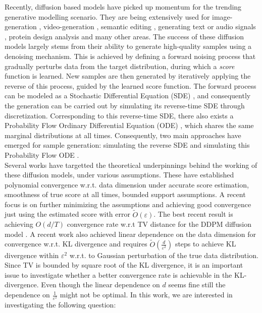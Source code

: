 \documentclass{article}
\begin{document}
\noindent
Recently, diffusion based models have picked up momentum for the trending generative modelling scenario. They are being extensively used  for image-generation \cite{song2019generative, croitoru2023diffusion, lugmayr2022repaint, song2020denoising, nichol2021glide, song2021maximum, ho2020denoising}, video-generation \cite{epstein2023diffusion, chen2023control}, semantic editing \cite{lugmayr2022repaint}, generating text \cite{li2022diffusion} or audio signals \cite{liu2023audioldm}, protein design analysis \cite{gruver2023protein, guo2024diffusion} and many other areas. The success of these diffusion models largely stems from their ability to generate high-quality samples using a denoising mechanism. This is achieved by defining a forward noising process that gradually perturbs data from the target distribution, during which a \textit{score} function is learned. New samples are then generated by iteratively applying the reverse of this process, guided by the learned score function. The forward process can be modeled as a Stochastic Differential Equation (SDE) \cite{song2020score}, and consequently the generation can be carried out by simulating its reverse-time SDE through discretization. Corresponding to this reverse-time SDE, there also exists a Probability Flow Ordinary Differential Equation (ODE) \cite{song2020score}, which shares the same marginal distributions at all times. Consequently, two main approaches have emerged for sample generation: simulating the reverse SDE \cite{song2020score, chen2022sampling} and simulating this Probability Flow ODE \cite{xu2024provably}. \\



\noindent
Several works \cite{chen2022sampling, chen2022improved, holzmuller2023convergence, benton2023nearly, li2024d} have targetted the theoretical underpinnings behind the working of these diffusion models, under various assumptions. These have established polynomial convergence w.r.t. data dimension under accurate score estimation, smoothness of true score at all times, bounded support assumptions. A recent focus \cite{chen2023improved, li2024d, benton2023nearly} is on further minimizing the assumptions and achieving good convergence just using the estimated score with error $\tilde{O}(\varepsilon)$. The best recent result \cite{li2024d} is achieving $O(d/T)$ convergence rate w.r.t TV distance for the DDPM diffusion model \cite{ho2020denoising}.
A recent work \cite{benton2023nearly} also achieved linear dependence on the data dimension for convergence w.r.t. KL divergence and requires $\tilde{O}(\frac{d}{\varepsilon^2})$ steps to achieve KL divergence within $\varepsilon^2$ w.r.t. to Gaussian perturbation of the true data distribution. Since TV is bounded by square root of the KL divergence, it is an important issue to investigate whether a better convergence rate is achievable in the KL-divergence. Even though the linear dependence on $d$ seems fine still the dependence on $\frac{1}{\varepsilon^2}$ might not be optimal. In this work, we are interested in investigating the following question: 
\end{document}
